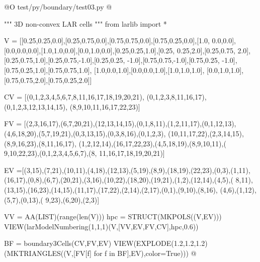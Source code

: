\documentclass[11pt,oneside]{article}	%
\begin{document}
@O test/py/boundary/test03.py
@{""" 3D non-convex LAR cells """
from larlib import *

V = [[0.25,0.25,0.0],[0.25,0.75,0.0],[0.75,0.75,0.0],[0.75,0.25,0.0],[1.0, 0.0,0.0],
[0.0,0.0,0.0],[1.0,1.0,0.0],[0.0,1.0,0.0],[0.25,0.25,1.0],[0.25, 0.25,2.0],[0.25,0.75,
2.0],[0.25,0.75,1.0],[0.25,0.75,-1.0],[0.25,0.25, -1.0],[0.75,0.75,-1.0],[0.75,0.25,
-1.0],[0.75,0.25,1.0],[0.75,0.75,1.0], [1.0,0.0,1.0],[0.0,0.0,1.0],[1.0,1.0,1.0],
[0.0,1.0,1.0],[0.75,0.75,2.0],[0.75,0.25,2.0]]

CV = [(0,1,2,3,4,5,6,7,8,11,16,17,18,19,20,21), (0,1,2,3,8,11,16,17),
(0,1,2,3,12,13,14,15), (8,9,10,11,16,17,22,23)]

FV = [(2,3,16,17),(6,7,20,21),(12,13,14,15),(0,1,8,11),(1,2,11,17),(0,1,12,13),
(4,6,18,20),(5,7,19,21),(0,3,13,15),(0,3,8,16),(0,1,2,3),
(10,11,17,22),(2,3,14,15),(8,9,16,23),(8,11,16,17),
(1,2,12,14),(16,17,22,23),(4,5,18,19),(8,9,10,11),(
9,10,22,23),(0,1,2,3,4,5,6,7),(8, 11,16,17,18,19,20,21)]

EV =[(3,15),(7,21),(10,11),(4,18),(12,13),(5,19),(8,9),(18,19),(22,23),(0,3),(1,11),
(16,17),(0,8),(6,7),(20,21),(3,16),(10,22),(18,20),(19,21),(1,2),(12,14),(4,5),(
8,11),(13,15),(16,23),(14,15),(11,17),(17,22),(2,14),(2,17),(0,1),(9,10),(8,16),
(4,6),(1,12),(5,7),(0,13),( 9,23),(6,20),(2,3)]

VV = AA(LIST)(range(len(V)))
hpc = STRUCT(MKPOLS((V,EV)))
VIEW(larModelNumbering(1,1,1)(V,[VV,EV,FV,CV],hpc,0.6))

BF = boundary3Cells(CV,FV,EV)
VIEW(EXPLODE(1.2,1.2,1.2)(MKTRIANGLES((V,[FV[f] for f in BF],EV),color=True)))
@}
\end{document}
